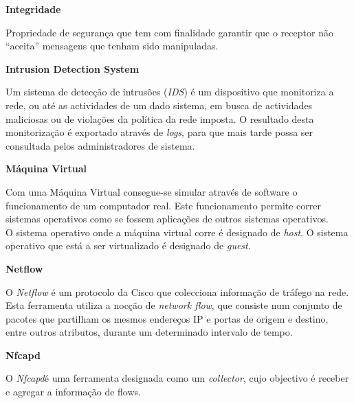 \begin{description}
    \item \textbf{Integridade}

    Propriedade de segurança que tem com finalidade garantir que o receptor não “aceita” mensagens que tenham sido manipuladas.
\end{description}

\begin{description}
    \item \textbf{Intrusion Detection System}
    
    Um sistema de detecção de intrusões (\textit{IDS}) é um dispositivo que monitoriza a rede, ou até as actividades de um dado sistema, em busca de actividades maliciosas ou de violações da política da rede imposta. O resultado desta monitorização é exportado através de \textit{logs}, para que mais tarde possa ser consultada pelos administradores de sistema.
\end{description}

\begin{description}
    \item \textbf{Máquina Virtual}
    
    Com uma Máquina Virtual consegue-se simular através de software o funcionamento de um computador real. Este funcionamento permite correr sistemas operativos como se fossem aplicações de outros sistemas operativos.\\

    O sistema operativo onde a máquina virtual corre é designado de \textit{host}.
    O sistema operativo que está a ser virtualizado é designado de \textit{guest}.
\end{description}

\begin{description}
    \item \textbf{Netflow}

O \textit{Netflow} é um protocolo da Cisco que colecciona informação de tráfego na rede. Esta ferramenta utiliza a nocção de \textit{network flow}, que consiste num conjunto de pacotes que partilham os mesmos endereços IP e portas de origem e destino, entre outros atributos, durante um determinado intervalo de tempo. 
\end{description}

\begin{description}
    \item \textbf{Nfcapd}

O \textit{Nfcapd}é uma ferramenta designada como um \textit{collector}, cujo objectivo é receber e agregar a informação de flows.
\end{description}

